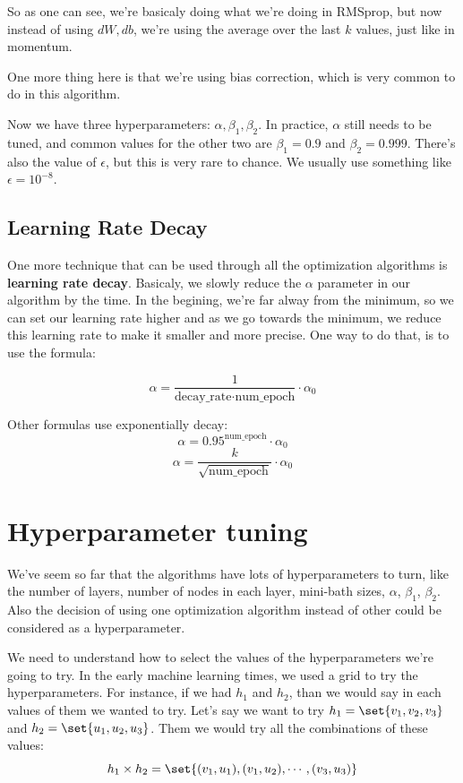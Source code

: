 \documentclass[12pt, a4paper, oneside]{book}
\begin{document}
So as one can see, we're basicaly doing what we're doing in RMSprop, but now
instead of using $dW,db$, we're using the average over the last $k$ values, just
like in momentum.

One more thing here is that we're using bias correction, which is very common to
do in this algorithm.

Now we have three hyperparameters: $\alpha,\beta_1,\beta_2$. In practice,
$\alpha$ still needs to be tuned, and common values for the other two are
$\beta_1=0.9$ and $\beta_2=0.999$. There's also the value of $\epsilon$, but
this is very rare to chance. We usually use something like $\epsilon=10^{-8}$.

\subsection{Learning Rate Decay}%
\label{sub:learning_rate_decay}

One more technique that can be used through all the optimization algorithms is
\textbf{learning rate decay}. Basicaly, we slowly reduce the $\alpha$ parameter
in our algorithm by the time. In the begining, we're far alway from the minimum,
so we can set our learning rate higher and as we go towards the minimum, we
reduce this learning rate to make it smaller and more precise. One way to do
that, is to use the formula:

\[
\alpha=\dfrac{1}{\text{decay\_rate}\cdot\text{num\_epoch}}\cdot\alpha_0
\]

Other formulas use exponentially decay:
\[
\alpha=0.95^{\text{num\_epoch}}\cdot\alpha_0
\]
\[
\alpha=\dfrac{k}{\sqrt{\text{num\_epoch}}}\cdot\alpha_0
\]

\section{Hyperparameter tuning}%
\label{sec:hyperparameter_tuning}

We've seem so far that the algorithms have lots of hyperparameters to turn, like
the number of layers, number of nodes in each layer, mini-bath sizes, $\alpha$,
$\beta_1$, $\beta_2$. Also the decision of using one optimization algorithm
instead of other could be considered as a hyperparameter.

We need to understand how to select the values of the hyperparameters we're
going to try. In the early machine learning times, we used a grid to try the
hyperparameters. For instance, if we had $h_1$ and $h_2$, than we would say in
each values of them we wanted to try. Let's say we want to try
$h_1=\set{v_1,v_2,v_3}$ and $h_2=\set{u_1,u_2,u_3}$. Them we would try all the
combinations of these values:
\[
    h_1\times h_2=\set{(v_1,u_1),(v_1,u_2),\cdots,(v_3,u_3)}
\]
\end{document}
